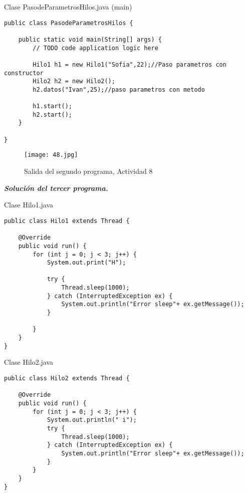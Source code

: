 \begin{center}
Clase PasodeParametrosHilos.java (main)
\end{center}

\begin{verbatim}
public class PasodeParametrosHilos {

    public static void main(String[] args) {
        // TODO code application logic here

        Hilo1 h1 = new Hilo1("Sofia",22);//Paso parametros con constructor
        Hilo2 h2 = new Hilo2();
        h2.datos("Ivan",25);//paso parametros con metodo
        
        h1.start();
        h2.start();
    }
    
}
\end{verbatim} \vspace{1cm}
\begin{figure}[h!]
		\centering
		{\texttt{[image: 48.jpg]}\par} 
		\caption{Salida del segundo programa, Actividad 8}\vspace{1cm}
\end{figure}

\textbf{\textit{Solución del tercer programa.}}

\begin{center}
Clase Hilo1.java
\end{center}

\begin{verbatim}
public class Hilo1 extends Thread {

    @Override
    public void run() {
        for (int j = 0; j < 3; j++) {
            System.out.print("H");
            
            try {
                Thread.sleep(1000);
            } catch (InterruptedException ex) {
                System.out.println("Error sleep"+ ex.getMessage());
            }
          
        }
    }
}
\end{verbatim} \vspace{1cm}

\begin{center}
Clase Hilo2.java
\end{center}

\begin{verbatim}
public class Hilo2 extends Thread {

    @Override
    public void run() {
        for (int j = 0; j < 3; j++) {
            System.out.println(" i");
            try {
                Thread.sleep(1000);
            } catch (InterruptedException ex) {
                System.out.println("Error sleep"+ ex.getMessage());
            }
        }
    }
}
\end{verbatim} \vspace{1cm}

